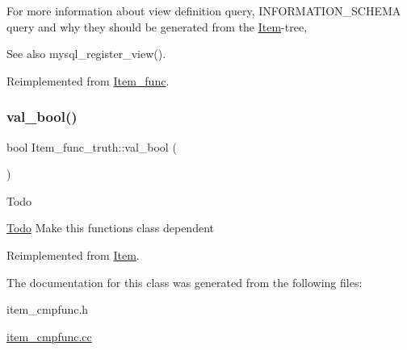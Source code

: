 For more information about view definition query, I\+N\+F\+O\+R\+M\+A\+T\+I\+O\+N\+\_\+\+S\+C\+H\+E\+MA query and why they should be generated from the \mbox{\hyperlink{classItem}{Item}}-\/tree, \begin{DoxySeeAlso}{See also}
mysql\+\_\+register\+\_\+view(). 
\end{DoxySeeAlso}


Reimplemented from \mbox{\hyperlink{classItem__func_afb302ee25d4721ace27d3f5053d4ee41}{Item\+\_\+func}}.

\mbox{\label{classItem__func__truth_a1c0f8cdf192cec99a3e0b5eafa1845bf}} 
\subsubsection{\texorpdfstring{val\+\_\+bool()}{val\_bool()}}
{\footnotesize\ttfamily bool Item\+\_\+func\+\_\+truth\+::val\+\_\+bool (\begin{DoxyParamCaption}{ }\end{DoxyParamCaption})\hspace{0.3cm}{\ttfamily [virtual]}}

\begin{DoxyRefDesc}{Todo}
\item[\mbox{\hyperlink{todo__todo000026}{Todo}}]Make this functions class dependent \end{DoxyRefDesc}


Reimplemented from \mbox{\hyperlink{classItem_a875594d2b9d99ccff3863bfd435828f0}{Item}}.



The documentation for this class was generated from the following files\+:\begin{DoxyCompactItemize}
\item 
item\+\_\+cmpfunc.\+h\item 
\mbox{\hyperlink{item__cmpfunc_8cc}{item\+\_\+cmpfunc.\+cc}}\end{DoxyCompactItemize}
